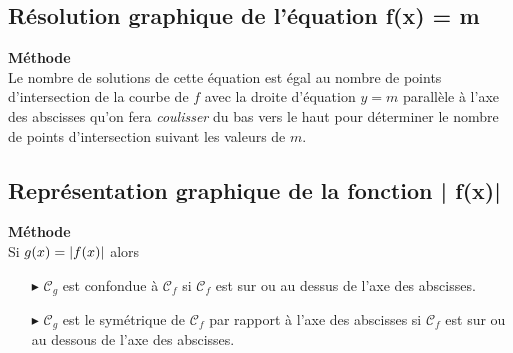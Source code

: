 \subsection{Résolution graphique de l'équation   f(x) = m }
\textbf{Méthode}\\
Le nombre de solutions de cette équation est égal au nombre de points d'intersection de la courbe de $ f $ avec la droite d'équation $ y=m$  parallèle à l'axe des abscisses  qu'on fera \textit{coulisser} du bas vers le haut pour déterminer le nombre de points d'intersection suivant les valeurs de $ m.$

\subsection{Représentation  graphique de la fonction | f(x)|}
\textbf{Méthode}\\
Si $ g(x)=\left\lvert f(x) \right\rvert $ alors 
\begin{itemize}
\item[$  \blacktriangleright$]  $ \mathcal{C}_{g} $  est confondue à $ \mathcal{C}_{f} $  si $ \mathcal{C}_{f} $  est sur ou au dessus de l'axe des abscisses.
\item[$  \blacktriangleright$]  $ \mathcal{C}_{g} $  est le symétrique  de $ \mathcal{C}_{f} $ par rapport à l'axe des abscisses   si $ \mathcal{C}_{f} $  est sur ou au dessous de l'axe des abscisses.

\end{itemize}


